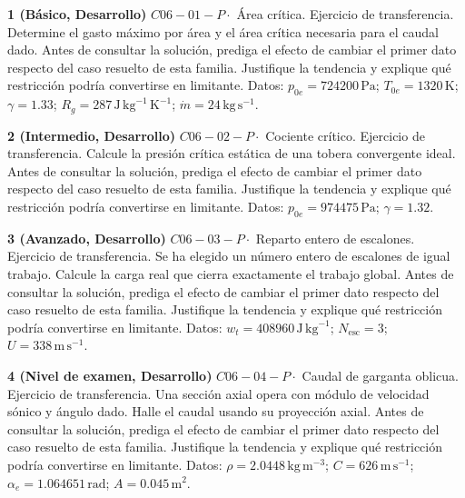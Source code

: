 \documentclass[10pt,openany]{book}
\begin{document}
\begin{tcolorbox}[title={Ejercicios propuestos}, studiumworked, breakable]

\noindent\textbf{1 (Básico, Desarrollo)}
\(C06-01-P \cdot\) Área crítica. Ejercicio de transferencia. Determine el gasto máximo por área y el área crítica necesaria para el caudal dado. Antes de consultar la solución, prediga el efecto de cambiar el primer dato respecto del caso resuelto de esta familia. Justifique la tendencia y explique qué restricción podría convertirse en limitante. Datos: \(p_{0e}=724200\, \mathrm{Pa}\); \(T_{0e}=1320\, \mathrm{K}\); \(\gamma=1.33\); \(R_g=287\, \mathrm{J}\,\mathrm{kg}^{-1}\,\mathrm{K}^{-1}\); \(\dot m=24\, \mathrm{kg}\,\mathrm{s}^{-1}\).

\noindent\textbf{2 (Intermedio, Desarrollo)}
\(C06-02-P \cdot\) Cociente crítico. Ejercicio de transferencia. Calcule la presión crítica estática de una tobera convergente ideal. Antes de consultar la solución, prediga el efecto de cambiar el primer dato respecto del caso resuelto de esta familia. Justifique la tendencia y explique qué restricción podría convertirse en limitante. Datos: \(p_{0e}=974475\, \mathrm{Pa}\); \(\gamma=1.32\).

\noindent\textbf{3 (Avanzado, Desarrollo)}
\(C06-03-P \cdot\) Reparto entero de escalones. Ejercicio de transferencia. Se ha elegido un número entero de escalones de igual trabajo. Calcule la carga real que cierra exactamente el trabajo global. Antes de consultar la solución, prediga el efecto de cambiar el primer dato respecto del caso resuelto de esta familia. Justifique la tendencia y explique qué restricción podría convertirse en limitante. Datos: \(w_t=408960\, \mathrm{J}\,\mathrm{kg}^{-1}\); \(N_{\mathrm{esc}}=3\); \(U=338\, \mathrm{m}\,\mathrm{s}^{-1}\).

\noindent\textbf{4 (Nivel de examen, Desarrollo)}
\(C06-04-P \cdot\) Caudal de garganta oblicua. Ejercicio de transferencia. Una sección axial opera con módulo de velocidad sónico y ángulo dado. Halle el caudal usando su proyección axial. Antes de consultar la solución, prediga el efecto de cambiar el primer dato respecto del caso resuelto de esta familia. Justifique la tendencia y explique qué restricción podría convertirse en limitante. Datos: \(\rho=2.0448\, \mathrm{kg}\,\mathrm{m}^{-3}\); \(C=626\, \mathrm{m}\,\mathrm{s}^{-1}\); \(\alpha_e=1.064651\, \mathrm{rad}\); \(A=0.045\, \mathrm{m}^{2}\).
\end{tcolorbox}


\studiumchaptercheck
\end{document}
